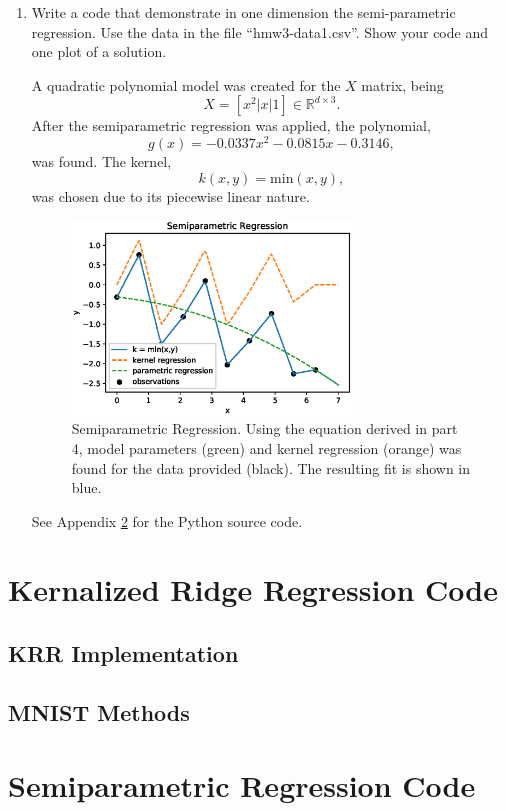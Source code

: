 \documentclass{article}[12pt]
\begin{document}
\begin{enumerate}
\item 
Write a code that demonstrate in one dimension the semi-parametric regression. Use the data in the file ``hmw3-data1.csv''. Show your code and one plot of a solution.  

A quadratic polynomial model was created for the $X$ matrix, being
\begin{equation}
X = [x^2 | x | 1] \in \mathbb R^{d \times 3}.
\end{equation}
After the semiparametric regression was applied, the polynomial,
\begin{equation}
g(x) = -0.0337 x^2 - 0.0815 x - 0.3146,
\end{equation}
was found. The kernel,
\begin{equation}
k(x,y) = \text{min}(x,y),
\end{equation}
was chosen due to its piecewise linear nature.

\begin{figure}[H]
\centering
\includegraphics[width=0.7\textwidth]{./img/semipara.eps}
\caption{Semiparametric Regression. Using the equation derived in part 4, model parameters (green) and kernel regression (orange) was found for the data provided (black). The resulting fit is shown in blue.}
\end{figure}

See Appendix \ref{app:semi} for the Python source code.

\end{enumerate}

\newpage
\begin{appendices}
\section{Kernalized Ridge Regression Code} \label{app:krr}
\subsection{KRR Implementation}

\subsection{MNIST Methods}

\section{Semiparametric Regression Code} \label{app:semi}

\end{appendices}
\end{document}
